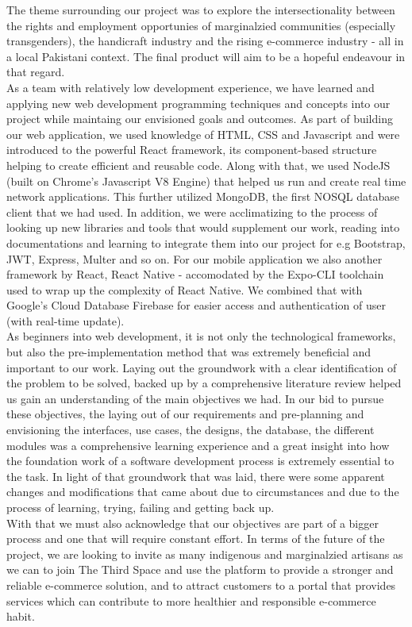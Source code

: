 The theme surrounding our project was to explore the intersectionality between the rights and employment opportunies of marginalzied communities (especially transgenders), the handicraft industry and the rising e-commerce industry - all in a local Pakistani context. The final product will aim to be a hopeful endeavour in that regard.\\
As a team with relatively low development experience, we have learned and applying new web development programming techniques and concepts into our project while maintaing our envisioned goals and outcomes. As part of building our web application, we used knowledge of HTML, CSS and Javascript and were introduced to the powerful React framework, its component-based structure helping to create efficient and reusable code. Along with that, we used NodeJS (built on Chrome's Javascript V8 Engine) that helped us run and create real time network applications. This further utilized MongoDB, the first NOSQL database client that we had used. In addition, we were acclimatizing to the process of looking up new libraries and tools that would supplement our work, reading into documentations and learning to integrate them into our project for e.g Bootstrap, JWT, Express, Multer and so on. For our mobile application we also another framework by React, React Native - accomodated by the Expo-CLI toolchain used to wrap up the complexity of React Native. We combined that with Google's Cloud Database Firebase for easier access and authentication of user (with real-time update).\\
As beginners into web development, it is not only the technological frameworks, but also the pre-implementation method that was extremely beneficial and important to our work. Laying out the groundwork with a clear identification of the problem to be solved, backed up by a comprehensive literature review helped us gain an understanding of the main objectives we had. In our bid to pursue these objectives, the laying out of our requirements and pre-planning and envisioning the interfaces, use cases, the designs, the database, the different modules was a comprehensive learning experience and a great insight into how the foundation work of a software development process is extremely essential to the task. In light of that groundwork that was laid, there were some apparent changes and modifications that came about due to circumstances and due to the process of learning, trying, failing and getting back up.\\
With that we must also acknowledge that our objectives are part of a bigger process and one that will require constant effort. In terms of the future of the project, we are looking to invite as many indigenous and marginalzied artisans as we can to join The Third Space and use the platform to provide a stronger and reliable e-commerce solution, and to attract customers to a portal that provides services which can contribute to more healthier and responsible e-commerce habit.